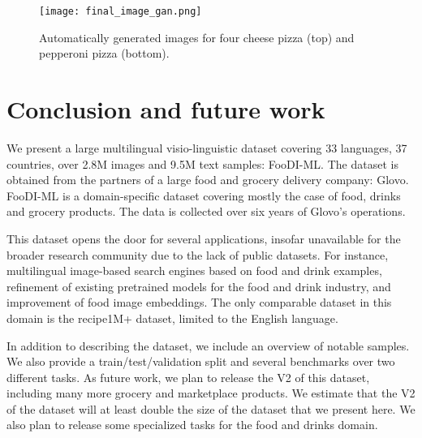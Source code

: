 \documentclass[10pt,twocolumn,letterpaper]{article}
\begin{document}
    \begin{figure}[htb]
        \centering
\texttt{[image: final\_image\_gan.png]}
        \caption
        { Automatically generated images for four cheese pizza (top) and pepperoni pizza (bottom).} 
        \label{fig:pepperoni_samples}
    \end{figure}


\section{Conclusion and future work}
\label{sec:conclusion}
We present a large multilingual visio-linguistic dataset covering 33 languages, 37 countries, over 2.8M images and 9.5M text samples: FooDI-ML. The dataset is obtained from the partners of a large food and grocery delivery company: Glovo. FooDI-ML is a domain-specific dataset covering mostly the case of food, drinks and grocery products. The data is collected over six years of Glovo's operations.

This dataset opens the door for several applications, insofar unavailable for the broader research community due to the lack of public datasets. For instance, multilingual image-based search engines based on food and drink examples, refinement of existing pretrained models for the food and drink industry, and improvement of food image embeddings. The only comparable dataset in this domain is the recipe1M+ dataset, limited to the English language.



In addition to describing the dataset, we include an overview of notable samples. We also provide a train/test/validation split and several benchmarks over two different tasks. As future work, we plan to release the V2 of this dataset, including many more grocery and marketplace products. We estimate that the V2 of the dataset will at least double the size of the dataset that we present here. We also plan to release some specialized tasks for the food and drinks domain.


{\small


}
\end{document}
